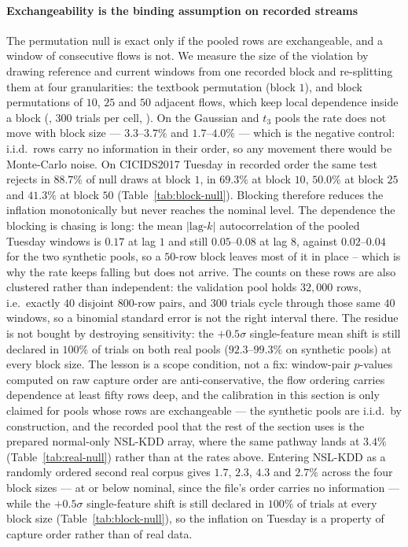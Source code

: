 \paragraph{Exchangeability is the binding assumption on recorded streams}
The permutation null is exact only if the pooled rows are exchangeable, and a window of
consecutive flows is not. We measure the size of the violation by drawing reference and
current windows from one recorded block and re-splitting them at four granularities: the
textbook permutation (block $1$), and block permutations of $10$, $25$ and $50$ adjacent
flows, which keep local dependence inside a block
(, $300$ trials per cell,
). On the
Gaussian and $t_3$ pools the rate does not move with block size --- $3.3$--$3.7\%$ and
$1.7$--$4.0\%$ --- which is the negative control: i.i.d.\ rows carry no information in
their order, so any movement there would be Monte-Carlo noise. On CICIDS2017 Tuesday in
recorded order the same test rejects in $88.7\%$ of null draws at block $1$, in $69.3\%$
at block $10$, $50.0\%$ at block $25$ and $41.3\%$ at block $50$
(Table~\ref{tab:block-null}). Blocking therefore reduces the inflation monotonically but
never reaches the nominal level. The dependence the blocking is chasing is long: the mean
$|\text{lag-}k|$ autocorrelation of the pooled Tuesday windows is $0.17$ at lag $1$ and
still $0.05$--$0.08$ at lag $8$, against $0.02$--$0.04$ for the two synthetic pools, so a
$50$-row block leaves most of it in place -- which is why the rate keeps falling but does
not arrive. The counts on these rows are also clustered rather than independent: the
validation pool holds $32{,}000$ rows, i.e.\ exactly $40$ disjoint $800$-row pairs, and
$300$ trials cycle through those same $40$ windows, so a binomial standard error is not
the right interval there. The residue is not bought by destroying sensitivity:
the $+0.5\sigma$ single-feature mean shift is still declared in $100\%$ of trials on both
real pools ($92.3$--$99.3\%$ on synthetic pools) at every block size. The
lesson is a scope condition, not a fix: window-pair $p$-values computed on raw capture
order are anti-conservative, the flow ordering carries dependence at least fifty rows
deep, and the calibration in this section is only claimed for pools whose rows are
exchangeable --- the synthetic pools are i.i.d.\ by construction, and the recorded pool
that the rest of the section uses is the prepared normal-only NSL-KDD array, where the
same pathway lands at $3.4\%$ (Table~\ref{tab:real-null}) rather than at the rates above.
Entering NSL-KDD as a randomly ordered second real corpus gives $1.7$, $2.3$, $4.3$ and
$2.7\%$ across the four block sizes --- at or below nominal, since the file's order carries
no information --- while the $+0.5\sigma$ single-feature shift is still declared in $100\%$ of trials at
every block size (Table~\ref{tab:block-null}), so the inflation on Tuesday is a property
of capture order rather than of real data.

